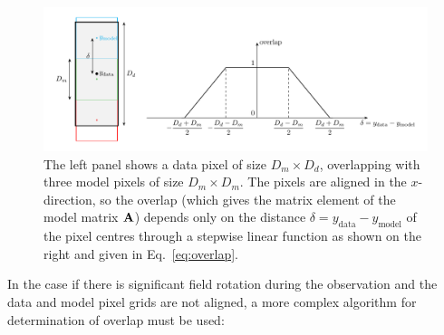 \begin{figure}
    \centering
    \includegraphics[width=\textwidth]{pixel_overlap.pdf}
    \caption[One-dimensional overlap as a function of pixel offset]{%
        The left panel shows a data pixel of size $D_{m}\times D_{d}$,
        overlapping with three model pixels of size $D_{m}\times D_{m}$.
        The pixels are aligned in the $x$-direction, so the overlap
        (which gives the matrix element of the model matrix $\mathbf{A}$)
        depends only on the distance $\delta = y_{\mathrm{data}} - y_{\mathrm{model}}$
        of the pixel centres through a stepwise linear function as shown on the right and given in Eq.~\eqref{eq:overlap}.
    }
  \label{fig:pixel_overlap}
\end{figure}

In the case if there is significant field rotation during
the observation and the data and model pixel grids are not aligned,
a more complex algorithm for determination of overlap must be used:

